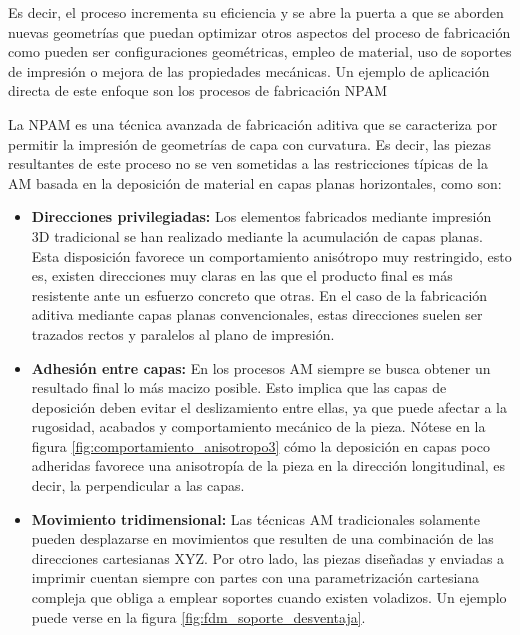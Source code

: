 Es decir, el proceso incrementa su eficiencia y se abre la puerta a que se aborden nuevas geometrías que puedan optimizar otros aspectos del proceso de fabricación como pueden ser configuraciones geométricas, empleo de material, uso de soportes de impresión o mejora de las propiedades mecánicas. Un ejemplo de aplicación directa de este enfoque son los procesos de fabricación \acrshort{NPAM}

La \acrshort{NPAM} es una técnica avanzada de fabricación aditiva que se caracteriza por permitir la impresión de geometrías de capa con curvatura. Es decir, las piezas resultantes de este proceso no se ven sometidas a las restricciones típicas de la \acrshort{AM} basada en la deposición de material en capas planas horizontales, como son:

\begin{itemize}
    \item \textbf{Direcciones privilegiadas:} Los elementos fabricados mediante impresión 3D tradicional se han realizado mediante la acumulación de capas planas. Esta disposición favorece un comportamiento anisótropo muy restringido, esto es, existen direcciones muy claras en las que el producto final es más resistente ante un esfuerzo concreto que otras. En el caso de la fabricación aditiva mediante capas planas convencionales, estas direcciones suelen ser trazados rectos y paralelos al plano de impresión.
    
    \item \textbf{Adhesión entre capas:} En los procesos \acrshort{AM} siempre se busca obtener un resultado final lo más macizo posible. Esto implica que las capas de deposición deben evitar el deslizamiento entre ellas, ya que puede afectar a la rugosidad, acabados y comportamiento mecánico de la pieza. Nótese en la figura \ref{fig:comportamiento_anisotropo3} cómo la deposición en capas poco adheridas favorece una anisotropía de la pieza en la dirección longitudinal, es decir, la perpendicular a las capas.

    \item \textbf{Movimiento tridimensional:} Las técnicas \acrshort{AM} tradicionales solamente pueden desplazarse en movimientos que resulten de una combinación de las direcciones cartesianas XYZ. Por otro lado, las piezas diseñadas y enviadas a imprimir cuentan siempre con partes con una parametrización cartesiana compleja que obliga a emplear soportes cuando existen voladizos. Un ejemplo puede verse en la figura \ref{fig:fdm_soporte_desventaja}.
\end{itemize}

